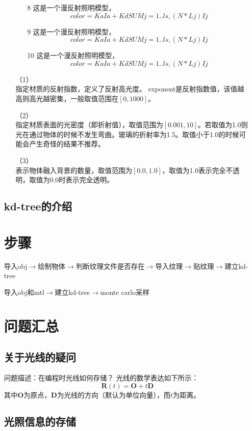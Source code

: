 \documentclass[10pt]{article}
\begin{document}
\begin{itemize}
\begin{itemize}
\item[8]{这是一个漫反射照明模型，}
$$color=KaIa+ Kd { SUM j=1..ls, (N * Lj)Ij }$$

\item[9]{这是一个漫反射照明模型，}
$$color=KaIa+ Kd { SUM j=1..ls, (N * Lj)Ij }$$

\item[10]{ 这是一个漫反射照明模型，}
$$color=KaIa+ Kd { SUM j=1..ls, (N * Lj)Ij }$$
\end{itemize}


\item[（1）]{}\\
指定材质的反射指数，定义了反射高光度。 exponent是反射指数值，该值越高则高光越密集，一般取值范围在$[0,1000]$。 

\item[（2）]{} \\
指定材质表面的光密度（即折射值），取值范围为$[0.001,10]$。若取值为1.0则光在通过物体的时候不发生弯曲。玻璃的折射率为1.5。取值小于1.0的时候可能会产生奇怪的结果不推荐。

\item[（3）]{}\\
表示物体融入背景的数量，取值范围为$[0.0,1.0]$，取值为1.0表示完全不透明，取值为0.0时表示完全透明。

\end{itemize}


\subsection{kd-tree的介绍}


\section{步骤}
导入obj$\to$绘制物体$\to$判断纹理文件是否存在$\to$导入纹理$\to$贴纹理$\to$建立kd-tree

导入obj和mtl$\to$建立kd-tree$\to$monte carlo采样

\section{问题汇总}
\subsection{关于光线的疑问}
问题描述：在编程时光线如何存储？
光线的数学表达如下所示：
$$\bm{R}(t)=\bm{O}+t\bm{D}$$
其中$\bm{O}$为原点，$\bm{D}$为光线的方向（默认为单位向量），而$t$为距离。
\subsection{光照信息的存储}
\end{document}
